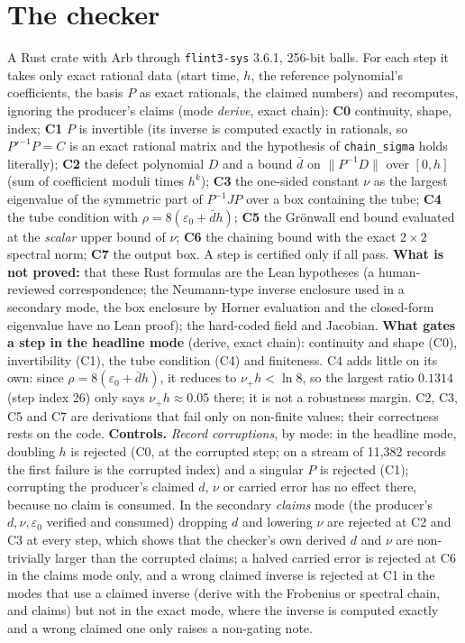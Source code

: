 \documentclass[11pt]{article}
\newcommand{\nrm}[1]{\lVert #1\rVert}
\begin{document}
\section{The checker}
A Rust crate with Arb through \texttt{flint3-sys} 3.6.1, 256-bit balls. For each step it takes only exact rational data (start time, $h$, the reference
polynomial's coefficients, the basis $P$ as exact rationals, the claimed numbers) and recomputes, ignoring the producer's claims (mode \emph{derive}, exact chain):
\textbf{C0} continuity, shape, index; \textbf{C1} $P$ is invertible (its inverse is computed exactly in rationals, so $P'^{-1}P=C$ is an exact rational matrix and the hypothesis of \texttt{chain\_sigma} holds
literally); \textbf{C2} the defect polynomial $D$ and a bound $\bar d$ on $\nrm{P^{-1}D}$ over $[0,h]$ (sum of coefficient moduli times $h^k$); \textbf{C3} the one-sided constant $\nu$ as the largest eigenvalue of the
symmetric part of $P^{-1}JP$ over a box containing the tube; \textbf{C4} the tube condition with $\rho=8(\varepsilon_0+\bar dh)$; \textbf{C5} the Gr\"onwall end bound evaluated at the \emph{scalar}
upper bound of $\nu$; \textbf{C6} the chaining bound with the exact $2\times2$ spectral norm; \textbf{C7} the output box. A step is certified only if all pass.
\textbf{What is not proved:} that these Rust formulas are the Lean hypotheses (a human-reviewed correspondence; the Neumann-type inverse enclosure used in a secondary mode, the box enclosure by Horner
evaluation and the closed-form eigenvalue have no Lean proof); the hard-coded field and Jacobian.
\textbf{What gates a step in the headline mode} (derive, exact chain): continuity and shape (C0), invertibility (C1), the tube condition (C4) and finiteness. C4 adds little on its own: since $\rho=8(\varepsilon_0+\bar dh)$,
it reduces to $\nu_+h<\ln 8$, so the largest ratio $0.1314$ (step index 26) only says $\nu_+h\approx0.05$ there; it is not a robustness margin. C2, C3, C5 and C7 are derivations that fail only on non-finite values; their correctness
rests on the code.
\textbf{Controls.} \emph{Record corruptions}, by mode: in the headline mode, doubling $h$ is rejected (C0, at the corrupted step; on a stream of 11{,}382 records the first failure is the corrupted index) and a singular $P$ is rejected (C1);
corrupting the producer's claimed $d$, $\nu$ or carried error has no effect there, because no claim is consumed. In the secondary \emph{claims} mode (the producer's $d,\nu,\varepsilon_0$ verified and consumed) dropping $d$ and lowering $\nu$ are rejected at C2 and C3 at every step,
which shows that the checker's own derived $d$ and $\nu$ are non-trivially larger than the corrupted claims; a halved carried error is rejected at C6 in the claims mode only, and a wrong claimed inverse is rejected at C1 in the modes that use a claimed inverse (derive with the Frobenius or spectral chain, and claims) but not in the exact mode, where the inverse is computed exactly and a wrong claimed one only raises a non-gating note.
\end{document}
